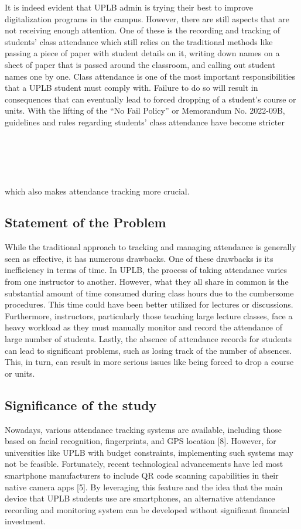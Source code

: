 \documentclass[journal]{./IEEE/IEEEtran}
\begin{document}
It is indeed evident that UPLB admin is trying their best to improve digitalization programs in the campus. However, there are still aspects that are not receiving enough attention. One of these is the recording and tracking of students’ class attendance which still relies on the traditional methods like passing a piece of paper with student details on it, writing down names on a sheet of paper that is passed around the classroom, and calling out student names one by one. Class attendance is one of the most important responsibilities that a UPLB student must comply with. Failure to do so will result in consequences that can eventually lead to forced dropping of a student’s course or units. With the lifting of the “No Fail Policy” or Memorandum No. 2022-09B, guidelines and rules regarding students’ class attendance have become stricter \\ \\ \\ \\ \\ \\ which also makes attendance tracking more crucial.


\subsection{Statement of the Problem}
While the traditional approach to tracking and managing attendance is generally seen as effective, it has numerous drawbacks. One of these drawbacks is its inefficiency in terms of time. In UPLB, the process of taking attendance varies from one instructor to another. However, what they all share in common is the substantial amount of time consumed during class hours due to the cumbersome procedures. This time could have been better utilized for lectures or discussions. Furthermore, instructors, particularly those teaching large lecture classes, face a heavy workload as they must manually monitor and record the attendance of large number of students. Lastly, the absence of attendance records for students can lead to significant problems, such as losing track of the number of absences. This, in turn, can result in more serious issues like being forced to drop a course or units.

\subsection{Significance of the study}
Nowadays, various attendance tracking systems are available, including those based on facial recognition, fingerprints, and GPS location [8]. However, for universities like UPLB with budget constraints, implementing such systems may not be feasible. Fortunately, recent technological advancements have led most smartphone manufacturers to include QR code scanning capabilities in their native camera apps [5]. By leveraging this feature and the idea that the main device that UPLB students use are smartphones, an alternative attendance recording and monitoring system can be developed without significant financial investment.
\end{document}
